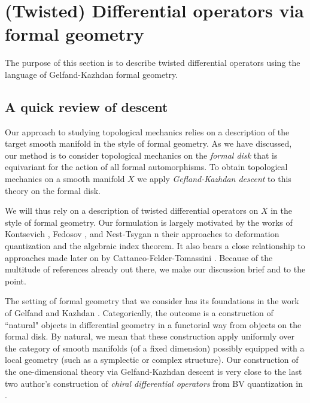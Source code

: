 \section{(Twisted) Differential operators via formal geometry}

The purpose of this section is to describe twisted differential operators using the language of Gelfand-Kazhdan formal geometry. 

\subsection{A quick review of descent}

Our approach to studying topological mechanics relies on a description of the target smooth manifold in the style of formal geometry. 
As we have discussed, our method is to consider topological mechanics on the {\em formal disk} that is equivariant for the action of all formal automorphisms. 
To obtain topological mechanics on a smooth manifold $X$ we apply {\em Gefland-Kazhdan descent} to this theory on the formal disk.

We will thus rely on a description of twisted differential operators on $X$ in the style of formal geometry. 
Our formulation is largely motivated by the works of Kontsevich \cite{KontsevichDQ1}, Fedosov \cite{Fedosov}, and Nest-Tsygan \cite{NT1} n their approaches to deformation quantization and the algebraic index theorem.
It also bears a close relationship to approaches made later on by Cattaneo-Felder-Tomassini \cite{CFGlobalization, CFTomassini}.
Because of the multitude of references already out there, we make our discussion brief and to the point. 

The setting of formal geometry that we consider has its foundations in the work of Gelfand and Kazhdan \cite{GK}.
Categorically, the outcome is a construction of ``natural" objects in differential geometry in a functorial way from objects on the formal disk.  
By natural, we mean that these construction apply uniformly over the category of smooth manifolds (of a fixed dimension) possibly equipped with a local geometry (such as a symplectic or complex structure). 
Our construction of the one-dimensional theory via Gelfand-Kazhdan descent is very close to the last two author's construction of {\em chiral differential operators} from BV quantization in \cite{GGW}. 


